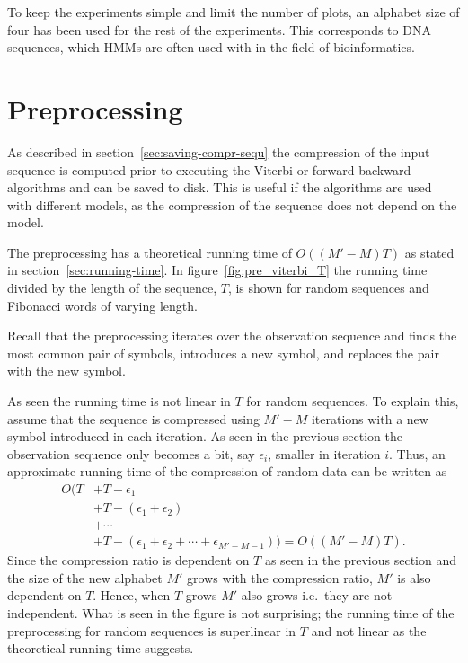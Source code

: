 To keep the experiments simple and limit the number of plots, an alphabet
size of four has been used for the rest of the experiments. This corresponds
to DNA sequences, which HMMs are often used with in the field of bioinformatics.

\section{Preprocessing}

As described in section~\ref{sec:saving-compr-sequ} the compression of the
input sequence is computed prior to executing the Viterbi or forward-backward
algorithms and can be saved to disk. This is useful if the algorithms are used with different
models, as the compression of the sequence does not depend on the model.

The preprocessing has a theoretical running time of
$O(( M' - M) T)$ as stated in
section~\ref{sec:running-time}. In figure~\ref{fig:pre_viterbi_T} the running
time divided by the length of the sequence, $T$, is shown for random sequences
and Fibonacci words of varying length.

Recall that the preprocessing iterates over the observation sequence and finds
the most common pair of symbols, introduces a new symbol, and replaces the pair
with the new symbol.

As seen the running time is not linear in $T$ for random sequences. To explain
this, assume that the sequence is compressed using
$M' - M$ iterations with a new
symbol introduced in each iteration. As seen in the previous section the
observation sequence only becomes a bit, say $\epsilon_i$, smaller in iteration
$i$. Thus, an approximate running time of the compression of random data can be
written as
\begin{equation*}
  \begin{aligned}
    O(T & + T - \epsilon_1                \\
        & + T - (\epsilon_1 + \epsilon_2) \\
        & + \cdots                        \\
        & + T -(\epsilon_1 + \epsilon_2 + \cdots + \epsilon_{M' - M - 1})) = O\left((M' - M) T \right) .
  \end{aligned}
\end{equation*}
Since the compression ratio is dependent on $T$ as seen in the previous section
and the size of the new alphabet $M'$ grows with the
compression ratio, $M'$ is also dependent on $T$. Hence,
when $T$ grows $M'$ also grows i.e.\ they are not
independent. What is seen in the figure is not surprising; the running
time of the preprocessing for random sequences is superlinear in $T$ and not
linear as the theoretical running time suggests.

